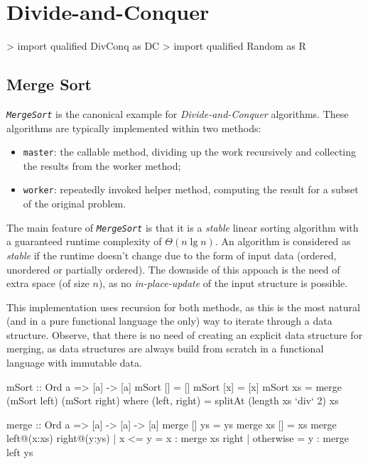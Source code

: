 \section{Divide-and-Conquer}


\begin{haskellcode}

> import qualified DivConq as DC
> import qualified Random as R

\end{haskellcode}


\subsection{Merge Sort}

\emph{\texttt{MergeSort}} is the canonical example for \emph{Divide-and-Conquer} algorithms.
These algorithms are typically implemented within two methods:
\begin{itemize}
    \item \texttt{master}: the callable method, dividing up the work recursively and collecting the results from the worker method;
    \item \texttt{worker}: repeatedly invoked helper method, computing the result for a subset of the original problem.
\end{itemize}

The main feature of \emph{\texttt{MergeSort}} is that it is a \emph{stable} linear sorting algorithm with a guaranteed runtime complexity of $\Theta (n \lg n)$.
An algorithm is considered as \emph{stable} if the runtime doesn't change due to the form of input data (ordered, unordered or partially ordered).
The downside of this appoach is the need of extra space (of size $n$), as no \emph{in-place-update} of the input structure is possible.

\begin{impl}
This implementation uses recursion for both methods, as this is the most natural (and in a pure functional language the only) way to iterate through a data structure.
Observe, that there is no need of creating an explicit data structure for merging, as data structures are always build from scratch in a functional language with immutable data.
\end{impl}

\begin{haskellcode}
  mSort :: Ord a => [a] -> [a]
  mSort [] = []
  mSort [x] = [x]
  mSort xs = merge (mSort left) (mSort right)
      where
      (left, right) = splitAt (length xs `div` 2) xs

  merge :: Ord a => [a] -> [a] -> [a]
  merge [] ys = ys
  merge xs [] = xs
  merge left@(x:xs) right@(y:ys)
      | x <= y    = x : merge xs right
      | otherwise = y : merge left ys
\end{haskellcode}

